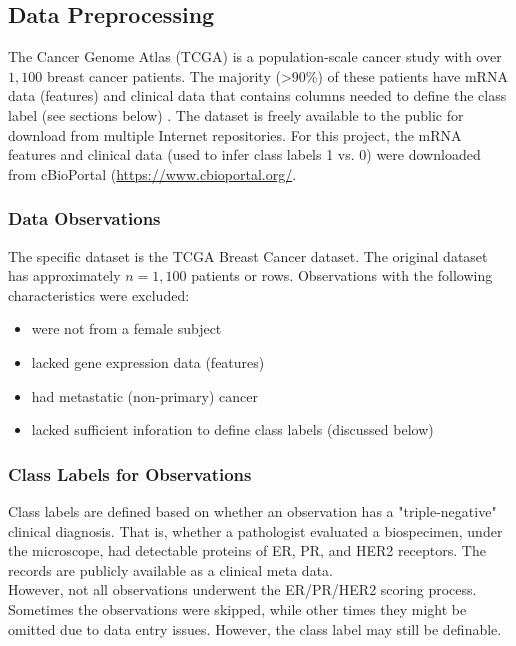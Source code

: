 \documentclass[11pt]{diazessay}
\begin{document}
\subsection{Data Preprocessing}

The Cancer Genome Atlas (TCGA) is a population-scale cancer study with  over $1,100$ breast cancer patients. The majority (>90\%) of these patients have mRNA data (features) and clinical data that contains columns needed to define the class label (see sections below) \cite{tcga2012}. The dataset is freely available to the public for download from multiple Internet repositories. For this project, the mRNA features and clinical data (used to infer class labels 1 vs. 0) were downloaded from cBioPortal (\url{https://www.cbioportal.org/}. \\

\subsubsection{Data Observations}

The specific dataset is the TCGA Breast Cancer dataset. The original dataset has approximately $n=1,100$ patients or rows. Observations with the following characteristics were excluded:

\begin{itemize}
	\item were not from a female subject
	\item lacked gene expression data (features)
	\item had metastatic (non-primary) cancer
	\item lacked sufficient inforation to define class labels (discussed below)
\end{itemize}


\subsubsection{Class Labels for Observations}

Class labels are defined based on whether an observation has a "triple-negative" clinical diagnosis. That is, whether a pathologist evaluated a biospecimen, under the microscope, had detectable proteins of ER, PR, and HER2 receptors. The records are publicly available as a clinical meta data. \\

However, not all observations underwent the ER/PR/HER2 scoring process. Sometimes the observations were skipped, while other times they might be omitted due to data entry issues. However, the class label may still be definable. \\
\end{document}
